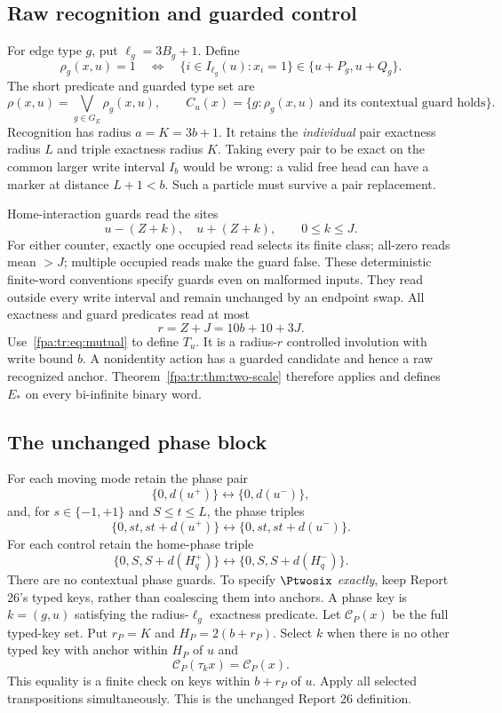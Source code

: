 \documentclass[11pt,a4paper]{article}
\numberwithin{equation}{section}
\newcommand{\Estar}{E_*}\newcommand{\Fstar}{F_*}
\begin{document}
\subsection{Raw recognition and guarded control}
For edge type $g$, put $\ell_g=3B_g+1$. Define
\begin{equation}\label{fpa:tr:eq:raw}
\rho_g(x,u)=1\quad\Longleftrightarrow\quad
\{i\in I_{\ell_g}(u):x_i=1\}\in\{u+P_g,u+Q_g\}.
\end{equation}
The short predicate and guarded type set are
\[
\rho(x,u)=\bigvee_{g\in G_E}\rho_g(x,u),\qquad
C_u(x)=\{g:\rho_g(x,u)\ \text{and its contextual guard holds}\}.
\]
Recognition has radius $a=K=3b+1$. It retains the \emph{individual} pair exactness radius $L$ and triple exactness radius $K$. Taking every pair to be exact on the common larger write interval $I_b$ would be wrong: a valid free head can have a marker at distance $L+1<b$. Such a particle must survive a pair replacement.

Home-interaction guards read the sites
\[
u-(Z+k),\quad u+(Z+k),\qquad 0\le k\le J.
\]
For either counter, exactly one occupied read selects its finite class; all-zero reads mean $>J$; multiple occupied reads make the guard false. These deterministic finite-word conventions specify guards even on malformed inputs. They read outside every write interval and remain unchanged by an endpoint swap. All exactness and guard predicates read at most
\[
r=Z+J=10b+10+3J.
\]
Use~\eqref{fpa:tr:eq:mutual} to define $T_u$. It is a radius-$r$ controlled involution with write bound $b$. A nonidentity action has a guarded candidate and hence a raw recognized anchor. Theorem~\ref{fpa:tr:thm:two-scale} therefore applies and defines $\Estar$ on every bi-infinite binary word.

\subsection{The unchanged phase block}\label{fpa:tr:sec:phase}
For each moving mode retain the phase pair
\[
\{0,d(u^+)\}\longleftrightarrow\{0,d(u^-)\},
\]
and, for $s\in\{-1,+1\}$ and $S\le t\le L$, the phase triples
\[
\{0,st,st+d(u^+)\}\longleftrightarrow
\{0,st,st+d(u^-)\}.
\]
For each control retain the home-phase triple
\[
\{0,S,S+d(H_q^+)\}\longleftrightarrow
\{0,S,S+d(H_q^-)\}.
\]
There are no contextual phase guards. To specify $\Ptwosix$ \emph{exactly}, keep Report 26's typed keys, rather than coalescing them into anchors. A phase key is $k=(g,u)$ satisfying the radius-$\ell_g$ exactness predicate. Let $\mathcal C_P(x)$ be the full typed-key set. Put $r_P=K$ and $H_P=2(b+r_P)$. Select $k$ when there is no other typed key with anchor within $H_P$ of $u$ and
\begin{equation}\label{fpa:tr:eq:phase-pros}
\mathcal C_P(\tau_k x)=\mathcal C_P(x).
\end{equation}
This equality is a finite check on keys within $b+r_P$ of $u$. Apply all selected transpositions simultaneously. This is the unchanged Report 26 definition.
\end{document}
